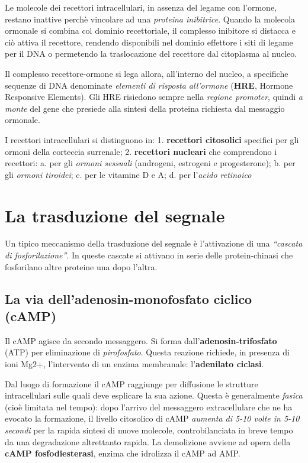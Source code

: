 \documentclass[]{article}
\begin{document}
Le molecole dei recettori intracellulari, in assenza del legame con
l'ormone, restano inattive perchè vincolare ad una \emph{proteina
inibitrice}. Quando la molecola ormonale si combina col dominio
recettoriale, il complesso inibitore si distacca e ciò attiva il
recettore, rendendo disponibili nel dominio effettore i siti di legame
per il DNA o permetendo la traslocazione del recettore dal citoplasma al
nucleo.

Il complesso recettore-ormone si lega allora, all'interno del nucleo, a
specifiche sequenze di DNA denominate \emph{elementi di risposta
all'ormone} (\textbf{HRE}, Hormone Responsive Elements). Gli HRE
risiedono sempre nella \emph{regione promoter}, quindi \emph{a monte}
del gene che presiede alla sintesi della proteina richiesta dal
messaggio ormonale.

I recettori intracellulari si distinguono in: 1. \textbf{recettori
citosolici} specifici per gli ormoni della corteccia surrenale; 2.
\textbf{recettori nucleari} che comprendono i recettori: a. per gli
\emph{ormoni sessuali} (androgeni, estrogeni e progesterone); b. per gli
\emph{ormoni tiroidei}; c. per le vitamine D e A; d. per l'\emph{acido
retinoico}

\section{La trasduzione del segnale}\label{la-trasduzione-del-segnale}

Un tipico meccanismo della trasduzione del segnale è l'attivazione di
una \emph{``cascata di fosforilazione''}. In queste cascate si attivano
in serie delle protein-chinasi che fosforilano altre proteine una dopo
l'altra.

\subsection{La via dell'adenosin-monofosfato ciclico
(cAMP)}\label{la-via-delladenosin-monofosfato-ciclico-camp}

Il cAMP agisce da secondo messaggero. Si forma
dall'\textbf{adenosin-trifosfato} (ATP) per eliminazione di
\emph{pirofosfato}. Questa reazione richiede, in presenza di ioni Mg2+,
l'intervento di un enzima membranale: l'\textbf{adenilato ciclasi}.

Dal luogo di formazione il cAMP raggiunge per diffusione le strutture
intracellulari sulle quali deve esplicare la sua azione. Questa è
generalmente \emph{fasica} (cioè limitata nel tempo): dopo l'arrivo del
messaggero extracellulare che ne ha evocato la formazione, il livello
citosolico di cAMP \emph{aumenta di 5-10 volte in 5-10 secondi} per la
rapida sintesi di nuove molecole, controbilanciata in breve tempo da una
degradazione altrettanto rapida. La demolizione avviene ad opera della
\textbf{cAMP fosfodiesterasi}, enzima che idrolizza il cAMP ad AMP.
\end{document}

